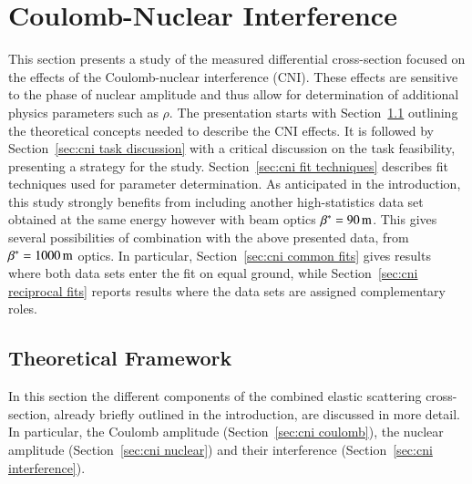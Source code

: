 \section{Coulomb-Nuclear Interference}
\label{sec:coulomb}

This section presents a study of the measured differential cross-section focused on the effects of the Coulomb-nuclear interference (CNI). These effects are sensitive to the phase of nuclear amplitude and thus allow for determination of additional physics parameters such as $\rho$. The presentation starts with Section~\ref{sec:cni framework} outlining the theoretical concepts needed to describe the CNI effects. It is followed by Section~\ref{sec:cni task discussion} with a critical discussion on the task feasibility, presenting a strategy for the study. Section~\ref{sec:cni fit techniques} describes fit techniques used for parameter determination. As anticipated in the introduction, this study strongly benefits from including another high-statistics data set \cite{8tev-90m} obtained at the same energy however with beam optics $\beta^* = 90\,{\rm m}$. This gives several possibilities of combination with the above presented data, from $\beta^* = 1000\,{\rm m}$ optics. In particular, Section~\ref{sec:cni common fits} gives results where both data sets enter the fit on equal ground, while Section~\ref{sec:cni reciprocal fits} reports results where the data sets are assigned complementary roles.




\subsection{Theoretical Framework}
\label{sec:cni framework}

In this section the different components of the combined elastic scattering cross-section, already briefly outlined in the introduction, are discussed in more detail. In particular, the Coulomb amplitude (Section~\ref{sec:cni coulomb}), the nuclear amplitude (Section~\ref{sec:cni nuclear}) and their interference (Section~\ref{sec:cni interference}).

